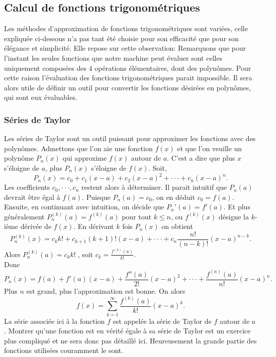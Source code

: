 \documentclass{article}
\begin{document}
\subsection{Calcul de fonctions trigonométriques}
Les méthodes d'approximation de fonctions trigonométriques sont variées, celle expliquée ci-dessous n'a pas tant été choisie pour son efficacité que pour son élégance et simplicité. Elle repose sur cette observation:
Remarquons que pour l'instant les seules fonctions que notre machine peut évaluer sont celles uniquement composées des 4 opérations élémentaires, dont des polynômes. Pour cette raison l'évaluation des fonctions trigonométriques parait impossible. Il sera alors utile de définir un outil pour convertir les fonctions désirées en polynômes, qui sont eux évaluables.
\subsubsection{Séries de Taylor}
Les séries de Taylor sont un outil puissant pour approximer les fonctions avec des polynômes. Admettons que l'on aie une fonction $f(x)$ et que l'on veuille un polynôme $P_n(x)$ qui approxime $f(x)$ autour de $a$. C'est a dire que plus $x$ s'éloigne de $a$, plus $P_n(x)$ s'éloigne de $f(x)$. Soit,
$$P_n(x) = c_0 + c_1(x-a) + c_2(x-a)^2+\cdot\cdot\cdot+c_n(x-a)^n.$$
Les coefficients $c_0, \cdot\cdot\cdot,c_n$ restent alors à déterminer.
Il parait intuitif que $P_n(a)$ devrait être égal à $f(a)$. Puisque $P_n(a) = c_0$, on en déduit $c_0=f(a)$. Ensuite, en continuant avec intuition, on décide que $P_n'(a) = f'(a)$. Et plus généralement $P_n^{(k)}(a) = f^{(k)}(a)$ pour tout $k\le n$, ou $f^{(k)}(x)$ désigne la $k$-ième dérivée de $f(x)$. En dérivant $k$ fois $P_n(x)$ on obtient
$$
P_n^{(k)}(x) = c_kk!+c_{k+1}(k+1)!(x-a)+\cdot\cdot\cdot+c_n\frac{n!}{(n-k)!}(x-a)^{n-k}.
$$
Alors $P_n^{(k)}(a) = c_kk!\;$, soit $c_k = \frac{f^{(k)}(a)}{k!}$.\\
Donc
$$P_n(x) = f(a) + f'(a)(x-a) + \frac{f''(a)}{2!}(x-a)^2+\cdot\cdot\cdot+\frac{f^{(n)}(a)}{n!}(x-a)^n.$$
Plus $n$ est grand, plus l'approximation est bonne.
On alors
$$f(x) = \sum_{k=1}^{\infty}\frac{f^{(k)}(a)}{k!}(x-a)^k.$$
La série associée ici à la fonction $f$ est appelée la série de Taylor de $f$ autour de $a$. Montrer qu'une fonction est en vérité égale à sa série de Taylor est un exercice plus compliqué et ne sera donc pas détaillé ici. Heureusement la grande partie des fonctions utilisées couramment le sont.
\end{document}
